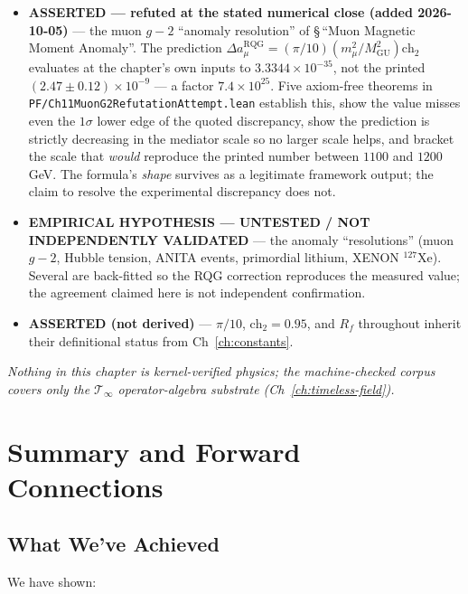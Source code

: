 \begin{itemize}
\item \textbf{ASSERTED --- refuted at the stated numerical close (added
2026-10-05)} --- the muon $g-2$ ``anomaly resolution'' of
\S\,``Muon Magnetic Moment Anomaly''. The prediction
$\Delta a_\mu^{\text{RQG}} = (\pi/10)(m_\mu^2/M_{\text{GU}}^2)\text{ch}_2$
evaluates at the chapter's own inputs to $3.3344\times10^{-35}$, not the
printed $(2.47\pm0.12)\times10^{-9}$ --- a factor $7.4\times10^{25}$. Five
axiom-free theorems in \texttt{PF/Ch11MuonG2RefutationAttempt.lean} establish
this, show the value misses even the $1\sigma$ lower edge of the quoted
discrepancy, show the prediction is strictly decreasing in the mediator scale
so no larger scale helps, and bracket the scale that \emph{would} reproduce the
printed number between $1100$ and $1200$ GeV. The formula's \emph{shape}
survives as a legitimate framework output; the claim to resolve the
experimental discrepancy does not.
\item \textbf{EMPIRICAL HYPOTHESIS --- UNTESTED / NOT INDEPENDENTLY VALIDATED} --- the anomaly ``resolutions'' (muon $g-2$, Hubble tension, ANITA events, primordial lithium, XENON $^{127}$Xe). Several are back-fitted so the RQG correction reproduces the measured value; the agreement claimed here is not independent confirmation.
\item \textbf{ASSERTED (not derived)} --- $\pi/10$, $\text{ch}_2=0.95$, and $R_f$ throughout inherit their definitional status from Ch~\ref{ch:constants}.
\end{itemize}
\emph{Nothing in this chapter is kernel-verified physics; the machine-checked corpus covers only the $\mathcal{T}_\infty$ operator-algebra substrate (Ch~\ref{ch:timeless-field}).}

\section{Summary and Forward Connections}

\subsection{What We've Achieved}

We have shown:

